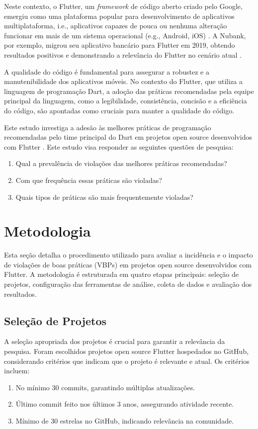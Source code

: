 \documentclass[12pt]{article}
\begin{document}
Neste contexto, o Flutter, um \textit{framework} de código aberto criado pelo Google, emergiu como uma plataforma popular para desenvolvimento de aplicativos multiplataforma, i.e., aplicativos capazes de pouca ou nenhuma alteração funcionar em mais de um sistema operacional (e.g., Android, iOS) \cite{flutter}. A Nubank, por exemplo, migrou seu aplicativo bancário para Flutter em 2019, obtendo resultados positivos e demonstrando a relevância do Flutter no cenário atual \cite{Nubank2023}.

A qualidade do código é fundamental para assegurar a robustez e a manutenibilidade dos aplicativos móveis. No contexto do Flutter, que utiliza a linguagem de programação Dart, a adoção das práticas recomendadas pela equipe principal da linguagem, como a legibilidade, consistência, concisão e a eficiência do código, são apontadas como cruciais para manter a qualidade do código.

Este estudo investiga a adesão às melhores práticas de programação recomendadas pelo time principal do Dart em projetos open source desenvolvidos com Flutter \cite{dartBestPractices}. Este estudo visa responder as seguintes questões de pesquisa:
\begin{enumerate}
    \item Qual a prevalência de violações das melhores práticas recomendadas?
    \item Com que frequência essas práticas são violadas?
    \item Quais tipos de práticas são mais frequentemente violadas?
\end{enumerate}

\section{Metodologia}

Esta seção detalha o procedimento utilizado para avaliar a incidência e o impacto de violações de boas práticas (VBPs) em projetos open source desenvolvidos com Flutter. A metodologia é estruturada em quatro etapas principais: seleção de projetos, configuração das ferramentas de análise, coleta de dados e avaliação dos resultados.

\subsection{Seleção de Projetos}
A seleção apropriada dos projetos é crucial para garantir a relevância da pesquisa. Foram escolhidos projetos open source Flutter hospedados no GitHub, considerando critérios que indicam que o projeto é relevante e atual. Os critérios incluem:
\begin{enumerate}
    \item No mínimo 30 commits, garantindo múltiplas atualizações.
    \item Último commit feito nos últimos 3 anos, assegurando atividade recente.
    \item Mínimo de 30 estrelas no GitHub, indicando relevância na comunidade.
\end{enumerate}
\end{document}
